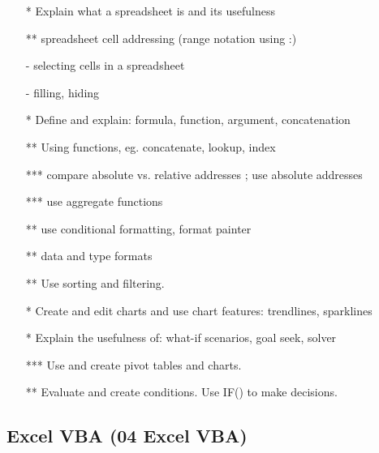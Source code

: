 \documentclass{article}%
\begin{document}
\begin{itemize}



\item[*] Explain what a spreadsheet is and its usefulness
 \item[**]  spreadsheet cell addressing (range notation using :)
\item[-] selecting cells in a spreadsheet
\item[-] filling, hiding
\item[*] Define and explain: formula, function, argument, concatenation
 \item[**]  Using functions, eg. concatenate, lookup, index
\item[***]  compare absolute vs. relative addresses ; use absolute addresses
\item[***] use aggregate functions
 \item[**]  use conditional formatting, format painter
 \item[**]  data and type formats
 \item[**]   Use sorting and filtering.
 \item[*]  Create and edit charts and use chart features: trendlines, sparklines
\item[*] Explain the usefulness of: what-if scenarios, goal seek, solver
\item[***] Use and create pivot tables and charts.
 \item[**]  Evaluate and create conditions. Use IF() to make decisions.
\end{itemize}


\subsection{Excel VBA (04 Excel VBA)}
\end{document}
